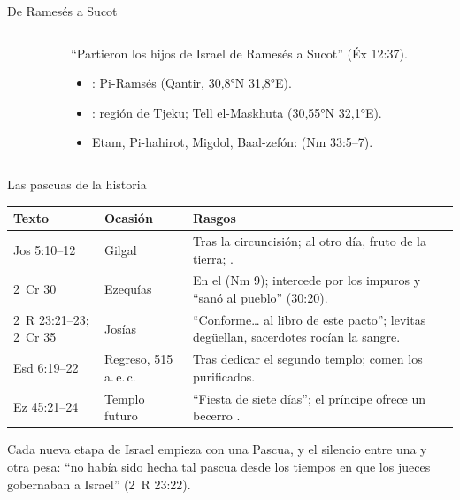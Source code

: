 \begin{frame}{De Ramesés a Sucot}
\begin{columns}[c,onlytextwidth]
\begin{column}{0.56\textwidth}
\end{column}
\begin{column}{0.42\textwidth}\small\RaggedRight
``Partieron los hijos de Israel de Ramesés a Sucot'' (Éx 12:37).
\begin{itemize}\small
\item {}: Pi-Ramsés (Qantir, 30,8°N 31,8°E).
\item {}: región de Tjeku; Tell el-Maskhuta (30,55°N 32,1°E).
\item Etam, Pi-hahirot, Migdol, Baal-zefón:  (Nm 33:5--7).
\end{itemize}
\end{column}
\end{columns}
\end{frame}

\begin{frame}{Las pascuas de la historia}
\scriptsize\renewcommand{\arraystretch}{1.15}
\begin{tabular}{@{}L{2.4cm}L{2.2cm}L{7.5cm}@{}}
\toprule
\textbf{Texto} & \textbf{Ocasión} & \textbf{Rasgos} \\ \midrule
Jos 5:10--12 & Gilgal & Tras la circuncisión; al otro día, fruto de la tierra; . \\
2~Cr 30 & Ezequías & En el  (Nm 9); intercede por los impuros y ``sanó al pueblo'' (30:20). \\
2~R 23:21--23; 2~Cr 35 & Josías & ``Conforme\ldots{} al libro de este pacto''; levitas degüellan, sacerdotes rocían la sangre. \\
Esd 6:19--22 & Regreso, 515 a.\,e.\,c. & Tras dedicar el segundo templo; comen los purificados. \\
Ez 45:21--24 & Templo futuro & ``Fiesta de siete días''; el príncipe ofrece un becerro . \\
\bottomrule
\end{tabular}\par\medskip
\small\RaggedRight Cada nueva etapa de Israel empieza con una Pascua, y el silencio entre una y otra pesa: ``no había sido hecha tal pascua desde los tiempos en que los jueces gobernaban a Israel'' (2~R 23:22).
\end{frame}

